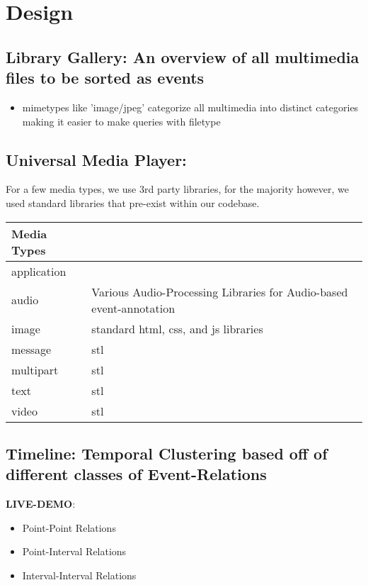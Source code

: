 \documentclass[11pt]{article}
\begin{document}
\newpage
\section{Design}
\label{sec:orgb4f7435}
\subsection{Library Gallery: An overview of all multimedia files to be sorted as events}
\label{sec:org68c48d3}
\begin{itemize}
\item mimetypes like 'image/jpeg' categorize all multimedia into distinct categories making it easier to make queries with filetype
\end{itemize}
\subsection{Universal Media Player:}
\label{sec:orgc2e499c}
For a few media types, we use 3rd party libraries, for the majority however, we used standard libraries that pre-exist within our codebase.
\begin{center}
\begin{tabular}{ll}
\hline
Media Types & \\
\hline
application & \\
audio & Various Audio-Processing Libraries for Audio-based event-annotation\\
image & standard html, css, and js libraries\\
message & stl\\
multipart & stl\\
text & stl\\
video & stl\\
\hline
\end{tabular}
\end{center}

\subsection{Timeline: Temporal Clustering based off of different classes of Event-Relations}
\label{sec:org585c2b4}
\textbf{\textbf{LIVE-DEMO}}:
\begin{itemize}
\item Point-Point Relations
\item Point-Interval Relations
\item Interval-Interval Relations
\end{itemize}
\end{document}
